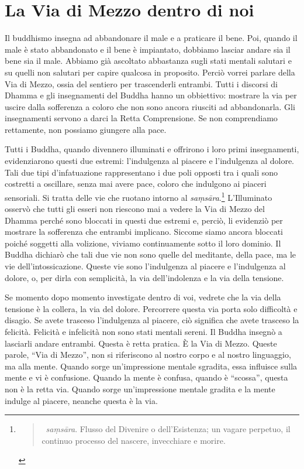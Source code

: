 \chapter{La Via di Mezzo dentro di noi}

Il buddhismo insegna ad abbandonare il male e a praticare il bene. Poi,
quando il male è stato abbandonato e il bene è impiantato, dobbiamo
lasciar andare sia il bene sia il male. Abbiamo già ascoltato abbastanza
sugli stati mentali salutari e su quelli non salutari per capire
qualcosa in proposito. Perciò vorrei parlare della Via di Mezzo, ossia
del sentiero per trascenderli entrambi. Tutti i discorsi di Dhamma e gli
insegnamenti del Buddha hanno un obbiettivo: mostrare la via per uscire
dalla sofferenza a coloro che non sono ancora riusciti ad abbandonarla.
Gli insegnamenti servono a darci la Retta Comprensione. Se non
comprendiamo rettamente, non possiamo giungere alla pace.

Tutti i Buddha, quando divennero illuminati e offrirono i loro primi
insegnamenti, evidenziarono questi due estremi: l'indulgenza al piacere
e l'indulgenza al dolore. Tali due tipi d'infatuazione rappresentano i
due poli opposti tra i quali sono costretti a oscillare, senza mai avere
pace, coloro che indulgono ai piaceri sensoriali. Si tratta delle vie
che ruotano intorno al \emph{saṃsāra}.\footnote{\begin{quote}
  ~\emph{saṃsāra}. Flusso del Divenire o dell'Esistenza; un vagare
  perpetuo, il continuo processo del nascere, invecchiare e morire.
  \end{quote}} L'Illuminato osservò che tutti gli esseri non riescono
mai a vedere la Via di Mezzo del Dhamma perché sono bloccati in questi
due estremi e, perciò, li evidenziò per mostrare la sofferenza che
entrambi implicano. Siccome siamo ancora bloccati poiché soggetti alla
volizione, viviamo continuamente sotto il loro dominio. Il Buddha
dichiarò che tali due vie non sono quelle del meditante, della pace, ma
le vie dell'intossicazione. Queste vie sono l'indulgenza al piacere e
l'indulgenza al dolore, o, per dirla con semplicità, la via
dell'indolenza e la via della tensione.

Se momento dopo momento investigate dentro di voi, vedrete che la via
della tensione è la collera, la via del dolore. Percorrere questa via
porta solo difficoltà e disagio. Se avete trasceso l'indulgenza al
piacere, ciò significa che avete trasceso la felicità. Felicità e
infelicità non sono stati mentali sereni. Il Buddha insegnò a lasciarli
andare entrambi. Questa è retta pratica. È la Via di Mezzo. Queste
parole, ``Via di Mezzo'', non si riferiscono al nostro corpo e al nostro
linguaggio, ma alla mente. Quando sorge un'impressione mentale sgradita,
essa influisce sulla mente e vi è confusione. Quando la mente è confusa,
quando è ``scossa'', questa non è la retta via. Quando sorge
un'impressione mentale gradita e la mente indulge al piacere, neanche
questa è la via.


